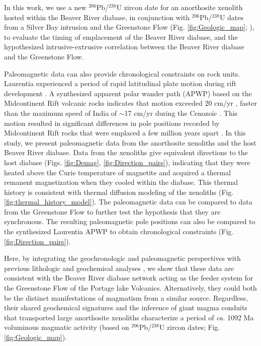 \documentclass[draft]{agujournal2019}
\begin{document}
In this work, we use a new $^{206}$Pb/$^{238}$U zircon date for an anorthosite xenolith hosted within the Beaver River diabase, in conjunction with $^{206}$Pb/$^{238}$U dates from a Silver Bay intrusion and the Greenstone Flow (Fig. \ref{fig:Geologic_map}; ), to evaluate the timing of emplacement of the Beaver River diabase, and the hypothesized intrusive-extrusive correlation between the Beaver River diabase and the Greenstone Flow.

Paleomagnetic data can also provide chronological constraints on rock units. Laurentia experienced a period of rapid latitudinal plate motion during rift development \cite{Swanson-Hysell2009a}. A synthesized apparent polar wander path (APWP) based on the Midcontinent Rift volcanic rocks indicates that motion exceeded 20 cm/yr \cite{Swanson-Hysell2019a}, faster than the maximum speed of India of $\sim$17 cm/yr during the Cenozoic \cite{Hinsbergen2011a}. This motion resulted in significant differences in pole positions recorded by Midcontinent Rift rocks that were emplaced a few million years apart \cite{Swanson-Hysell2019a}. In this study, we present paleomagnetic data from the anorthosite xenoliths and the host Beaver River diabase. Data from the xenoliths give equivalent directions to the host diabase (Figs. \ref{fig:Demag}, \ref{fig:Direction_pairs}), indicating that they were heated above the Curie temperature of magnetite and acquired a thermal remanent magnetization when they cooled within the diabase. This thermal history is consistent with thermal diffusion modeling of the xenoliths (Fig. \ref{fig:thermal_history_model}). The paleomagnetic data can be compared to data from the Greenstone Flow to further test the hypothesis that they are synchronous. The resulting paleomagnetic pole positions can also be compared to the synthesized Laurentia APWP to obtain chronological constraints (Fig. \ref{fig:Direction_pairs}).

Here, by integrating the geochronologic and paleomagnetic perspectives with previous lithologic and geochemical analyses \cite{Miller1997a, Doyle2016a}, we show that these data are consistent with the Beaver River diabase network acting as the feeder system for the Greenstone Flow of the Portage lake Volcanics. Alternatively, they could both be the distinct manifestations of magmatism from a similar source. Regardless, their shared geochemical signatures and the inference of giant magma conduits that transported large anorthosite xenoliths characterize a period of \textit{ca.} 1092 Ma voluminous magmatic activity (based on $^{206}$Pb/$^{238}$U zircon dates; Fig. \ref{fig:Geologic_map}).
\end{document}
